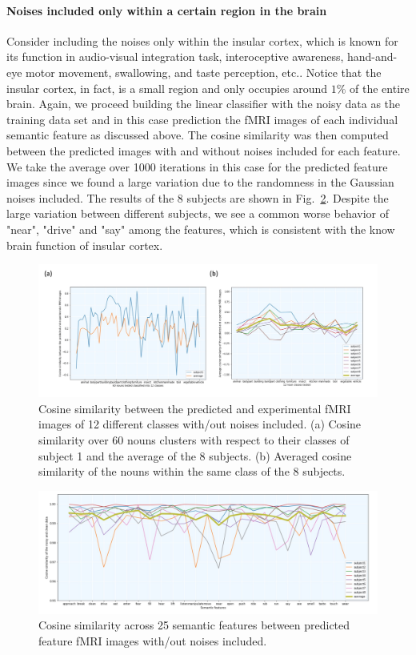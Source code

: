 \documentclass{article}
\begin{document}
\paragraph{Noises included only within a certain region in the brain} Consider including the noises only within the insular cortex, which is known for its function in audio-visual integration task, interoceptive awareness, hand-and-eye motor movement, swallowing, and taste perception, etc.. Notice that the insular cortex, in fact, is a small region and only occupies around $1\%$ of the entire brain. Again, we proceed building the linear classifier with the noisy data as the training data set and in this case prediction the fMRI images of each individual semantic feature as discussed above. The cosine similarity was then computed between the predicted images with and without noises included for each feature.  We take the average over 1000 iterations in this case for the predicted feature images since we found a large variation due to the randomness in the Gaussian noises included. The results of the 8 subjects are shown in Fig.~\ref{noisy_data_2}. Despite the large variation between different subjects, we see a common worse behavior of "near", "drive" and "say" among the features, which is consistent with the know brain function of insular cortex.

\begin{figure}
\centering
\includegraphics[scale=0.15]{noisy_data_1.jpeg}
\caption{Cosine similarity between the predicted and experimental fMRI images of 12 different classes with/out noises included. (a) Cosine similarity over 60 nouns clusters with respect to their classes of subject 1 and the average of the 8 subjects. (b) Averaged cosine similarity of the nouns within the same class of the 8 subjects.}
\label{noisy_data_1}
\end{figure}

\begin{figure}
\centering
\includegraphics[scale=0.15]{noisy_data_2.jpeg}
\caption{Cosine similarity across 25 semantic features between predicted feature fMRI images with/out noises included.}
\label{noisy_data_2}
\end{figure}
\end{document}
